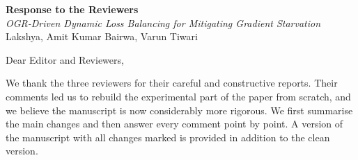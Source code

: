 \documentclass[11pt,a4paper]{article}
\begin{document}
\begin{center}
{\Large\bfseries Response to the Reviewers}\\[4pt]
\textit{OGR-Driven Dynamic Loss Balancing for Mitigating Gradient Starvation}\\[2pt]
Lakshya, Amit Kumar Bairwa, Varun Tiwari
\end{center}

Dear Editor and Reviewers,

We thank the three reviewers for their careful and constructive reports. Their comments led us to rebuild the experimental part of the paper from scratch, and we believe the manuscript is now considerably more rigorous. We first summarise the main changes and then answer every comment point by point. A version of the manuscript with all changes marked is provided in addition to the clean version.
\end{document}
